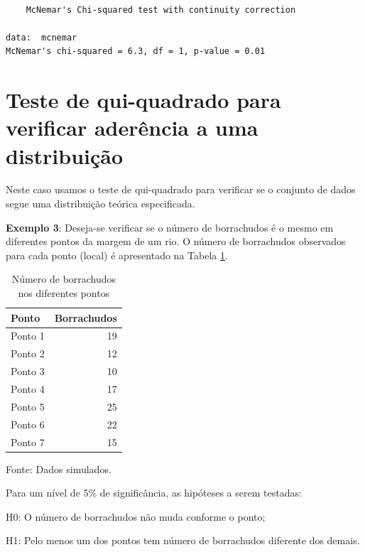 \documentclass[12pt,portuguese,oneside]{book}
\newenvironment{Shaded}{\begin{snugshade}}{\end{snugshade}}
\newcommand{\KeywordTok}[1]{\textcolor[rgb]{0.13,0.29,0.53}{\textbf{#1}}}
\newcommand{\DecValTok}[1]{\textcolor[rgb]{0.00,0.00,0.81}{#1}}
\newcommand{\OperatorTok}[1]{\textcolor[rgb]{0.81,0.36,0.00}{\textbf{#1}}}
\newcommand{\NormalTok}[1]{#1}
\begin{document}
\begin{verbatim}

    McNemar's Chi-squared test with continuity correction

data:  mcnemar
McNemar's chi-squared = 6.3, df = 1, p-value = 0.01
\end{verbatim}

\section{Teste de qui-quadrado para verificar aderência a uma
distribuição}\label{teste-de-qui-quadrado-para-verificar-aderencia-a-uma-distribuicao}

Neste caso usamos o teste de qui-quadrado para verificar se o conjunto
de dados segue uma distribuição teórica especificada.

\textbf{Exemplo 3}: Deseja-se verificar se o número de borrachudos é o
mesmo em diferentes pontos da margem de um rio. O número de borrachudos
observados para cada ponto (local) é apresentado na Tabela
\ref{tab:borrach}.

\begin{table}

\caption{\label{tab:borrach}Número de borrachudos nos diferentes pontos}
\centering
\begin{tabular}[t]{l|r}
\hline
Ponto & Borrachudos\\
\hline
Ponto 1 & 19\\
\hline
Ponto 2 & 12\\
\hline
Ponto 3 & 10\\
\hline
Ponto 4 & 17\\
\hline
Ponto 5 & 25\\
\hline
Ponto 6 & 22\\
\hline
Ponto 7 & 15\\
\hline
\end{tabular}
\end{table}

Fonte: Dados simulados.

Para um nível de 5\% de significância, as hipóteses a serem testadas:

H0: O número de borrachudos não muda conforme o ponto;

H1: Pelo menos um dos pontos tem número de borrachudos diferente dos
demais.

\begin{Shaded}
\end{Shaded}
\end{document}
